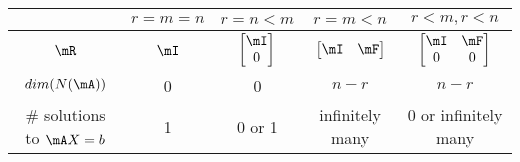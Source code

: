 \documentclass[11pt]{article}
\theoremstyle{plain}
\theoremstyle{definition}
\begin{document}
\begin{center}
\begin{tabular}{ c|c |c| c |c } 
 \hline
  & $r = m=n$ & $r = n < m$ & $r = m < n$ & $r<m,r<n$ \\ \hline 
  $\mR$& $\mI$ & $\begin{bmatrix} \mI \\ 0	\end{bmatrix}$ & $\begin{bmatrix} \mI & \mF \end{bmatrix}$ & $\begin{bmatrix} \mI & \mF \\ 0 &0	\end{bmatrix}$\\
   $dim(N(\mA))$& 0 &0& $n -r$ & $n-r$ \\
  \# solutions to $\mA X = b$ & 1 & 0 or 1 & infinitely many & 0 or infinitely many\\
 \hline
\end{tabular}
\end{center}



\vspace{.2cm}
\end{document}
